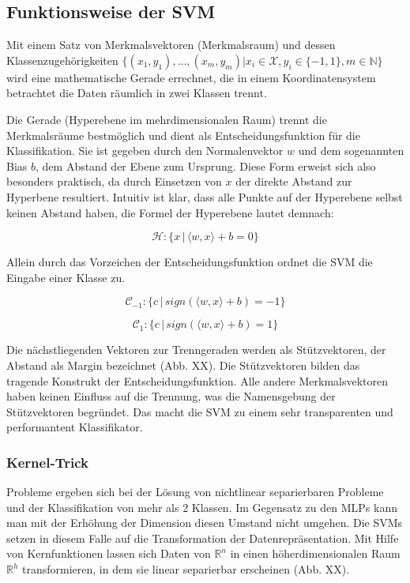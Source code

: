 \subsection{Funktionsweise der SVM}

Mit einem Satz von Merkmalsvektoren (Merkmalsraum) und dessen Klassenzugehörigkeiten $\{ (x_1, y_1), ..., (x_m, y_m) | x_i \in \mathcal{X}, y_i \in \{-1, 1\}, m \in \mathbb{N} \}$ wird eine mathematische Gerade errechnet,
die in einem Koordinatensystem betrachtet die Daten räumlich in zwei Klassen trennt. 



Die Gerade (Hyperebene im mehrdimensionalen Raum) trennt die Merkmalsräume bestmöglich und dient als Entscheidungsfunktion für die Klassifikation. Sie ist gegeben durch den Normalenvektor $w$ und dem sogenannten Bias $b$, dem Abstand der Ebene zum Ursprung. Diese Form erweist sich also besonders praktisch, da durch Einsetzen von $x$ der direkte Abstand zur Hyperbene resultiert.
Intuitiv ist klar, dass alle Punkte auf der Hyperebene selbst keinen Abstand haben, die Formel der Hyperebene lautet demnach: 
 
\begin{equation}
\label{eq:svm_hyperplane}
    \mathcal{H}: \{ x \,|\, \langle w,x \rangle + b = 0 \}
\end{equation}
 
Allein durch das Vorzeichen der Entscheidungsfunktion ordnet die SVM die Eingabe einer Klasse zu. 

\begin{equation}
\label{eq:svm_decision0}
    \mathcal{C}_{-1}: \{ c \,|\, sign(\langle w,x \rangle + b) = -1 \}
\end{equation}

\begin{equation}
\label{eq:svm_decision1}
    \mathcal{C}_1: \{ c \,|\, sign(\langle w,x \rangle + b) = 1 \}
\end{equation}

Die nächstliegenden Vektoren zur Trenngeraden werden als Stützvektoren, der Abstand als Margin bezeichnet (Abb. XX). 
Die Stützvektoren bilden das tragende Konstrukt der Entscheidungsfunktion. 
Alle andere Merkmalsvektoren haben keinen Einfluss auf die Trennung, was die Namensgebung der Stützvektoren begründet. 
Das macht die SVM zu einem sehr transparenten und performantent Klassifikator. 


\subsubsection{Kernel-Trick}
Probleme ergeben sich bei der Lösung von nichtlinear separierbaren Probleme und der Klassifikation von mehr als 2 Klassen.
Im Gegensatz zu den MLPs kann man mit der Erhöhung der Dimension diesen Umstand nicht umgehen. 
Die SVMs setzen in diesem Falle auf die Transformation der Datenrepräsentation. 
Mit Hilfe von Kernfunktionen lassen sich Daten von $\mathbb{R}^n$ in einen höherdimensionalen Raum $\mathbb{R}^h$ transformieren, in dem sie linear separierbar erscheinen (Abb. XX). 

